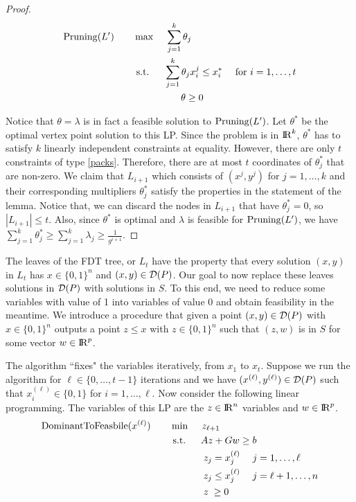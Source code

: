 \documentclass[runningheads]{llncs}
\begin{document}
\begin{proof}
	\begin{align}
		\prun(L')\quad\quad& \max\quad \;\sum_{j=1}^{k} \theta_j\\
		&\;\text{s.t.} \quad \;\;\sum_{j=1}^{k} \theta_j x^j_i\leq x^*_i &\mbox{ for $i=1,\ldots,t$} \label{packs}\\
		&\;{\color{white}{\text{s.t.}} }\quad  \;\quad\quad\theta \geq 0\label{nonneg}
	\end{align}
	
	Notice that $\theta = \lambda$ is in fact a feasible solution to $\operatorname{Pruning}(L')$. Let $\theta^*$ be the optimal vertex point solution to this LP. Since the problem is in ${\rm I\!R}^k$,  $\theta^*$ has to satisfy $k$ linearly independent constraints at equality. However, there are only $t$ constraints of type \ref{packs}. Therefore, there are at most $t$ coordinates of $\theta^*_j$ that are non-zero. We claim that $L_{i+1}$ which consists of $(x^j,y^j)$ for $j=1,\ldots,k$ and their corresponding multipliers $\theta^*_j$ satisfy the properties in the statement of the lemma. Notice that, we can discard the nodes in $L_{i+1}$ that have $\theta^*_j=0$, so $|L_{i+1}| \leq t$. Also, since $\theta^*$ is optimal and $\lambda$ is feasible for $\operatorname{Pruning}(L')$, we have $\sum_{j=1}^{k} \theta^*_j \geq \sum_{j=1}^{k}\lambda_j \geq \frac{1}{g^{i+1}}$. 
\end{proof}


The leaves of the FDT tree, or $L_t$ have the property that every solution $(x,y)$ in $L_t$ has $x\in\{0,1\}^n$ and $(x,y)\in \operatorname{\mathcal{D}}(P)$. Our goal to now replace these leaves solutions in $\operatorname{\mathcal{D}}(P)$ with solutions in $S$. To this end, we need to reduce some variables with value of 1 into variables of value 0 and obtain feasibility in the meantime. We introduce a procedure that given a  point $(x,y)\in \operatorname{\mathcal{D}}(P)$ with $x\in \{0,1\}^n$ outputs a point $z\leq x$ with $z\in \{0,1\}^n$ such that $(z,w)$ is in $S$ for some vector $w\in {\rm I\!R}^p$. 

The algorithm ``fixes" the variables iteratively, from $x_1$ to $x_t$. Suppose we run the algorithm for $\ell\in \{0,\ldots,t-1\}$ iterations and we have $(x^{(\ell)},y^{(\ell)})\in \operatorname{\mathcal{D}}(P)$  such that $x^{(\ell)}_i\in \{0,1\}$ for $i=1,\ldots,\ell$. Now consider the following linear programming. The variables of this LP are the $z\in {\rm I\!R}^n$ variables and $w\in {\rm I\!R}^p$.
\begin{align}
	\DOMtoS(x^{(\ell)})\quad\quad& \min\quad \;z_{\ell+1}\\
	&\;\text{s.t.} \quad \;\;Az+ Gw\geq b \\
	&\;{\color{white}{\text{s.t.}} }\quad \;\; \; z_j = x^{(\ell)}_j \quad \; j =1,\ldots, \ell\\
	&\;{\color{white}{\text{s.t.}} }\quad \; \;\; z_j \leq x^{(\ell)}_j \quad \; j = \ell+1,\ldots,n\\
	&\;{\color{white}{\text{s.t.}} }\quad \; \;\; z\;\geq 0
\end{align}
\end{document}
